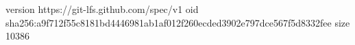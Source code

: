 version https://git-lfs.github.com/spec/v1
oid sha256:a9f712f55c8181bd4446981ab1af012f260ecded3902e797dce567f5d8332fee
size 10386
